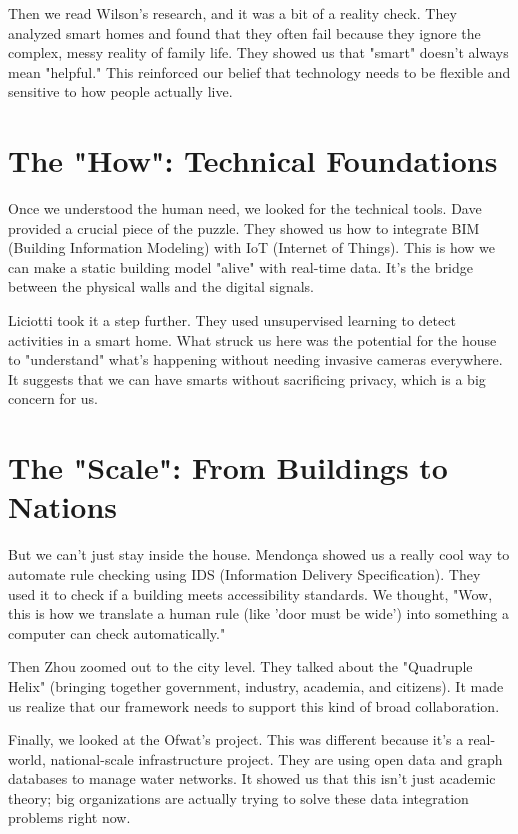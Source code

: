 \documentclass[a4paper,oneside,12pt]{report}
\begin{document}
Then we read Wilson's research\cite{Wilson2015}, and it was a bit of a reality check. They analyzed smart homes and found that they often fail because they ignore the complex, messy reality of family life. They showed us that "smart" doesn't always mean "helpful." This reinforced our belief that technology needs to be flexible and sensitive to how people actually live.

\section{The "How": Technical Foundations}
Once we understood the human need, we looked for the technical tools. Dave\cite{Dave2018} provided a crucial piece of the puzzle. They showed us how to integrate BIM (Building Information Modeling) with IoT (Internet of Things). This is how we can make a static building model "alive" with real-time data. It's the bridge between the physical walls and the digital signals.

Liciotti\cite{Liciotti2020} took it a step further. They used unsupervised learning to detect activities in a smart home. What struck us here was the potential for the house to "understand" what's happening without needing invasive cameras everywhere. It suggests that we can have smarts without sacrificing privacy, which is a big concern for us.

\section{The "Scale": From Buildings to Nations}
But we can't just stay inside the house. Mendonça\cite{Mendonca2024} showed us a really cool way to automate rule checking using IDS (Information Delivery Specification). They used it to check if a building meets accessibility standards. We thought, "Wow, this is how we translate a human rule (like 'door must be wide') into something a computer can check automatically."

Then Zhou\cite{Zhou2024} zoomed out to the city level. They talked about the "Quadruple Helix" (bringing together government, industry, academia, and citizens). It made us realize that our framework needs to support this kind of broad collaboration.

Finally, we looked at the Ofwat's\cite{ThamesWater2024} project. This was different because it's a real-world, national-scale infrastructure project. They are using open data and graph databases to manage water networks. It showed us that this isn't just academic theory; big organizations are actually trying to solve these data integration problems right now.
\end{document}
